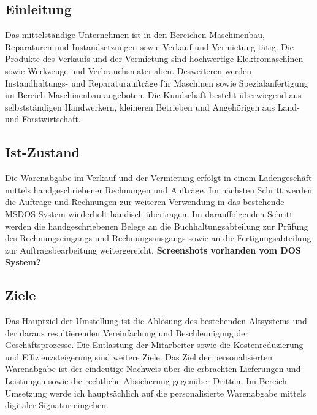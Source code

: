 \subsection{Einleitung}
Das mittelständige Unternehmen ist in den Bereichen Maschinenbau, Reparaturen und Instandsetzungen sowie Verkauf und Vermietung tätig. Die Produkte des Verkaufs und der Vermietung sind hochwertige Elektromaschinen sowie Werkzeuge und Verbrauchsmaterialien. Desweiteren werden Instandhaltungs- und Reparaturaufträge für Maschinen sowie Spezialanfertigung im Bereich Maschinenbau angeboten. Die Kundschaft besteht überwiegend aus selbstständigen Handwerkern, kleineren Betrieben und Angehörigen aus Land- und Forstwirtschaft. \cite{einleitung1}
\subsection{Ist-Zustand}
Die Warenabgabe im Verkauf und der Vermietung erfolgt in einem Ladengeschäft mittels handgeschriebener Rechnungen und Aufträge. Im nächsten Schritt werden die Aufträge und Rechnungen zur weiteren Verwendung in das bestehende MSDOS-System wiederholt händisch übertragen. Im darauffolgenden Schritt werden die handgeschriebenen Belege an die Buchhaltungsabteilung zur Prüfung des Rechnungseingangs und Rechnungsausgangs sowie an die Fertigungsabteilung zur Auftragsbearbeitung weitergereicht. \textbf{Screenshots vorhanden vom DOS System?} \cite{einleitung1}
\subsection{Ziele}
Das Hauptziel der Umstellung ist die Ablösung des bestehenden Altsystems und der daraus resultierenden Vereinfachung und Beschleunigung der Geschäftsprozesse. Die Entlastung der Mitarbeiter sowie die Kostenreduzierung und Effizienzsteigerung sind weitere Ziele. Das Ziel der personalisierten Warenabgabe ist der eindeutige Nachweis über die erbrachten Lieferungen und Leistungen sowie die rechtliche Absicherung gegenüber Dritten. Im Bereich Umsetzung werde ich hauptsächlich auf die personalisierte Warenabgabe mittels digitaler Signatur eingehen. \cite{einleitung1}

